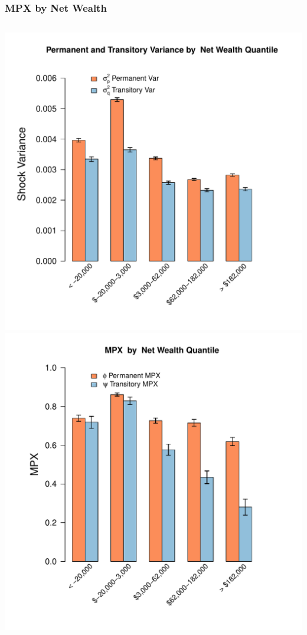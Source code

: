 \documentclass{beamer}
\begin{document}
\frame
{
	\frametitle{MPX by Net Wealth}
	\label{MPXbyNetWealth}
	\begin{columns}
		\centering
		\includegraphics[scale=0.35]{../Figures/VarianceByNetWealth_level_lincome_head.pdf}
		\centering
		\includegraphics[scale=0.35]{../Figures/MPXByNetWealth_level_lincome_head.pdf}
	\end{columns} 	
	\hyperlink{MPXbyLiquidWealth}{}
}
\end{document}
